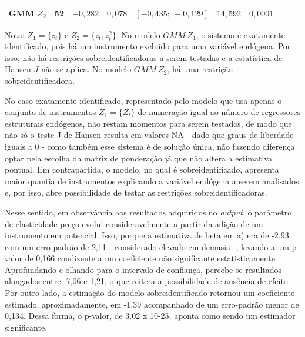 \documentclass[12pt,a4paper]{article}
\begin{document}
\begin{enumerate}[label=\textbf{\arabic*.}]
\begin{table}[H]
\begin{tabular}{lcccccc}
        GMM $Z_2$ 
        & 52 
        & $-0{,}282$ 
        & $0{,}078$ 
        & $[-0{,}435;\ -0{,}129]$ 
        & $14{,}592$ 
        & $0{,}0001$ \\
        \hline
    \end{tabular}

    \vspace{0.3em}
    \begin{minipage}{0.92\textwidth}
    \footnotesize
    Nota: $Z_1=\{z_t\}$ e $Z_2=\{z_t,z_t^2\}$. No modelo $GMM\ Z_1$, o sistema é exatamente identificado, pois há um instrumento excluído para uma variável endógena. Por isso, não há restrições sobreidentificadoras a serem testadas e a estatística de Hansen $J$ não se aplica. No modelo $GMM\ Z_2$, há uma restrição sobreidentificadora.
    \end{minipage}
\end{table}

No caso exatamente identificado, representado pelo modelo que usa apenas o conjunto de instrumentos $Z_1= \{Z_t\}$ de numeração igual ao número de regressores estruturais endógenos, não restam momentos para serem testados, de modo que não só o teste J de Hansen resulta em valores NA - dado que graus de liberdade iguais a 0 - como também esse sistema é de solução única, não fazendo diferença optar pela escolha da matriz de ponderação já que não altera a estimativa pontual. Em contrapartida, o modelo, no qual é sobreidentificado, apresenta maior quantia de instrumentos explicando a variável endógena a serem analisados e, por isso, abre possibilidade de testar as restrições sobreidentificadoras.

Nesse sentido, em observância aos resultados adquiridos no \textit{output}, o parâmetro de elasticidade-preço evolui consideravelmente a partir da adição de um instrumento em potencial. Isso, porque a estimativa de beta em a) era de -2,93 com um erro-padrão de 2,11 - considerado elevado em demasia -, levando a um p-valor de 0,166 condizente a um coeficiente não significante estatisticamente. Aprofundando e olhando para o intervalo de confiança, percebe-se resultados alongados entre -7,06 e 1,21, o que reitera a possibilidade de ausência de efeito. Por outro lado, a estimação do modelo sobreidentificado retornou um coeficiente estimado, aproximadamente, em -1,39 acompanhado de um erro-padrão menor de 0,134. Dessa forma, o p-valor, de 3.02 x 10-25, aponta como sendo um estimador significante.


\end{enumerate}
\end{document}
